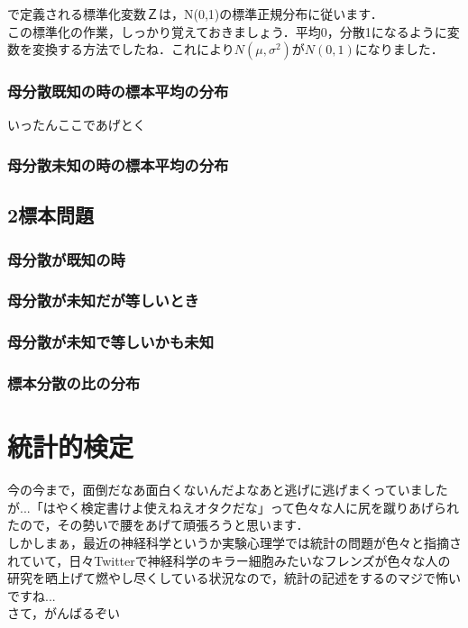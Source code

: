 \documentclass[11pt,a4paper,uplatex]{ujreport} 	%
\begin{document}
で定義される標準化変数Ｚは，N(0,1)の標準正規分布に従います．\\

この標準化の作業，しっかり覚えておきましょう．平均0，分散1になるように変数を変換する方法でしたね．これにより$N(\mu, \sigma^2)$が$N(0,1)$になりました．



\subsection{母分散既知の時の標本平均の分布}
いったんここであげとく
\subsection{母分散未知の時の標本平均の分布}
\section{2標本問題}
\subsection{母分散が既知の時}
\subsection{母分散が未知だが等しいとき}
\subsection{母分散が未知で等しいかも未知}
\subsection{標本分散の比の分布}

\chapter{統計的検定}
今の今まで，面倒だなあ面白くないんだよなあと逃げに逃げまくっていましたが...「はやく検定書けよ使えねえオタクだな」って色々な人に尻を蹴りあげられたので，その勢いで腰をあげて頑張ろうと思います．\\

しかしまぁ，最近の神経科学というか実験心理学では統計の問題が色々と指摘されていて，日々Twitterで神経科学のキラー細胞みたいなフレンズが色々な人の研究を晒上げて燃やし尽くしている状況なので，統計の記述をするのマジで怖いですね...\\


さて，がんばるぞい\\
\end{document}
